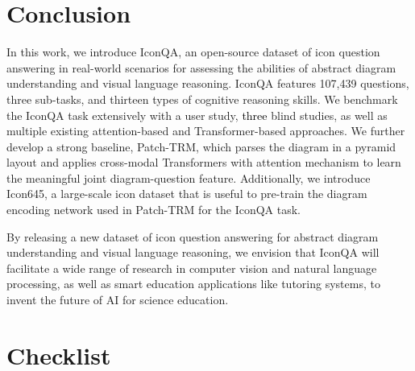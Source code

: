 \documentclass{article}
\begin{document}
\section{Conclusion}

In this work, we introduce IconQA, an open-source dataset of icon question answering in real-world scenarios for assessing the abilities of abstract diagram understanding and visual language reasoning. IconQA features 107,439 questions, three sub-tasks, and thirteen types of cognitive reasoning skills. We benchmark the IconQA task extensively with a user study, \textcolor{black}{three} blind studies, as well as multiple existing attention-based and Transformer-based approaches. We further develop a strong baseline, Patch-TRM, which parses the diagram in a pyramid layout and applies cross-modal Transformers with attention mechanism to learn the meaningful joint diagram-question feature. Additionally, we introduce Icon645, a large-scale icon dataset that is useful to pre-train the diagram encoding network used in Patch-TRM for the IconQA task. 

By releasing a new dataset of icon question answering for abstract diagram understanding and visual language reasoning, we envision that IconQA will facilitate a wide range of research in computer vision and natural language processing, as well as smart education applications like tutoring systems, to invent the future of AI for science education.



{
\small

}


\newpage
\section*{Checklist}
\end{document}
